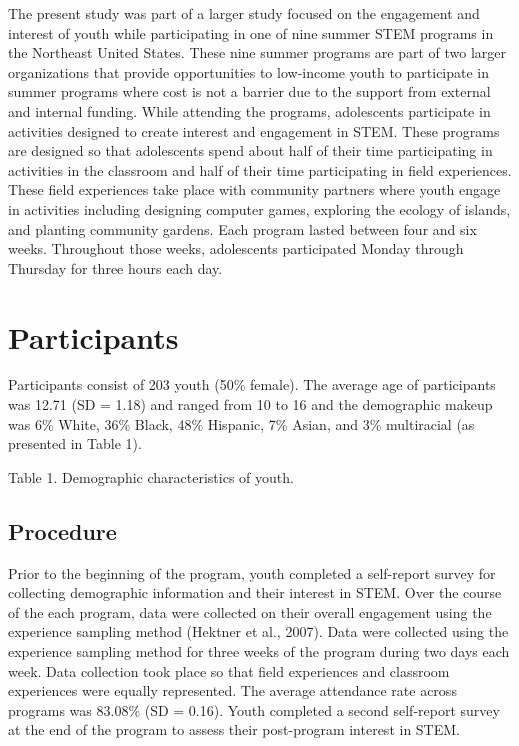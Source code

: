 \documentclass[man]{apa6}
\theoremstyle{definition}
\theoremstyle{definition}
\theoremstyle{definition}
\theoremstyle{remark}
\begin{document}
The present study was part of a larger study focused on the engagement
and interest of youth while participating in one of nine summer STEM
programs in the Northeast United States. These nine summer programs are
part of two larger organizations that provide opportunities to
low-income youth to participate in summer programs where cost is not a
barrier due to the support from external and internal funding. While
attending the programs, adolescents participate in activities designed
to create interest and engagement in STEM. These programs are designed
so that adolescents spend about half of their time participating in
activities in the classroom and half of their time participating in
field experiences. These field experiences take place with community
partners where youth engage in activities including designing computer
games, exploring the ecology of islands, and planting community gardens.
Each program lasted between four and six weeks. Throughout those weeks,
adolescents participated Monday through Thursday for three hours each
day.

\section{Participants}\label{participants}

Participants consist of 203 youth (50\% female). The average age of
participants was 12.71 (SD = 1.18) and ranged from 10 to 16 and the
demographic makeup was 6\% White, 36\% Black, 48\% Hispanic, 7\% Asian,
and 3\% multiracial (as presented in Table 1).

Table 1. Demographic characteristics of youth.

\subsection{Procedure}\label{procedure}

Prior to the beginning of the program, youth completed a self-report
survey for collecting demographic information and their interest in
STEM. Over the course of the each program, data were collected on their
overall engagement using the experience sampling method (Hektner et al.,
2007). Data were collected using the experience sampling method for
three weeks of the program during two days each week. Data collection
took place so that field experiences and classroom experiences were
equally represented. The average attendance rate across programs was
83.08\% (SD = 0.16). Youth completed a second self-report survey at the
end of the program to assess their post-program interest in STEM.
\end{document}
